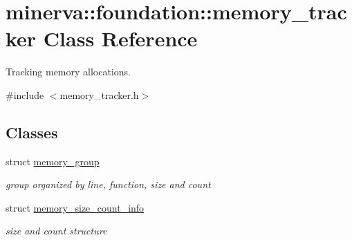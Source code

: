 \hypertarget{classminerva_1_1foundation_1_1memory__tracker}{}\section{minerva\+:\+:foundation\+:\+:memory\+\_\+tracker Class Reference}
\label{classminerva_1_1foundation_1_1memory__tracker}


Tracking memory allocations.  




{\ttfamily \#include $<$memory\+\_\+tracker.\+h$>$}

\subsection*{Classes}
\begin{DoxyCompactItemize}
\item 
struct \hyperlink{structminerva_1_1foundation_1_1memory__tracker_1_1memory__group}{memory\+\_\+group}
\begin{DoxyCompactList}\small\item\em group organized by line, function, size and count \end{DoxyCompactList}\item 
struct \hyperlink{structminerva_1_1foundation_1_1memory__tracker_1_1memory__size__count__info}{memory\+\_\+size\+\_\+count\+\_\+info}
\begin{DoxyCompactList}\small\item\em size and count structure \end{DoxyCompactList}\end{DoxyCompactItemize}
